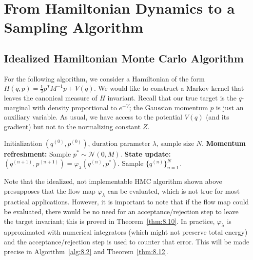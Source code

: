 
\section{From Hamiltonian Dynamics to a Sampling Algorithm}
\label{sec:8.2}

\subsection{Idealized Hamiltonian Monte Carlo Algorithm}
\label{sec:8.2.1}

For the following algorithm, we consider a Hamiltonian of the form
$H(q,p) = \frac{1}{2}p^T M^{-1}p + V(q)$. We would like to construct a Markov kernel that
leaves the canonical measure of $H$ invariant. Recall that our true target is the $q$-marginal
with density proportional to $e^{-V}$; the Gaussian momentum $p$ is just an auxiliary variable.
As usual, we have access to the potential $V(q)$ (and its gradient) but not to the normalizing
constant $Z$.

\begin{algorithm}[H]
\caption{Idealized, Not-Implementable Hamiltonian Monte Carlo}
\label{alg:8.1}
\begin{algorithmic}[1]
\Require Initialization $(q^{(0)}, p^{(0)})$, duration parameter $\lambda$, sample size $N$.
  \State \textbf{Momentum refreshment:} Sample $p^* \sim \mathcal{N}(0, M)$.
  \State \textbf{State update:} $(q^{(n+1)}, p^{(n+1)}) = \varphi_\lambda(q^{(n)}, p^*)$.
\EndFor
\Ensure Sample $\{q^{(n)}\}_{n=1}^N$.
\end{algorithmic}
\end{algorithm}

Note that the idealized, not implementable HMC algorithm shown above presupposes that the flow
map $\varphi_\lambda$ can be evaluated, which is not true for most practical applications.
However, it is important to note that if the flow map could be evaluated, there would be no need
for an acceptance/rejection step to leave the target invariant; this is proved in
Theorem~\ref{thm:8.10}. In practice, $\varphi_\lambda$ is approximated with numerical
integrators (which might not preserve total energy) and the acceptance/rejection step is used to
counter that error. This will be made precise in Algorithm~\ref{alg:8.2} and
Theorem~\ref{thm:8.12}.

